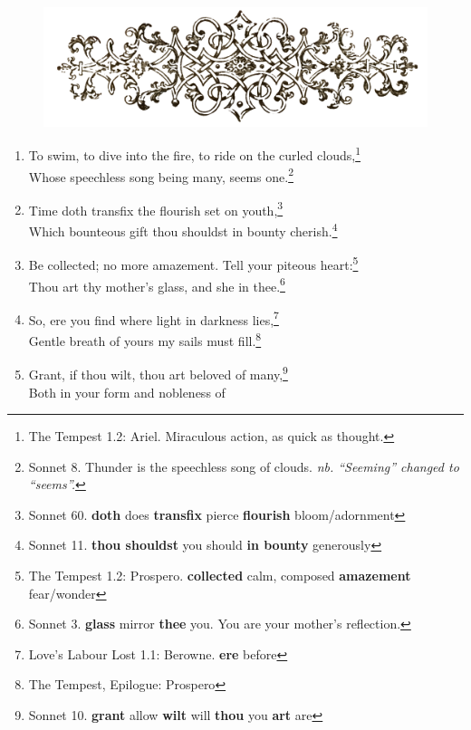 \documentclass[17pt,twoside]{extarticle}
\begin{document}
\thispagestyle{empty}

\begin{figure}[htbp]
\centering
\includegraphics[width=15.5cm]{images/frontispiece.png}
\end{figure}

\vspace{4mm}

\begin{enumerate}
\item
  To swim, to dive into the fire, to ride on the curled
  clouds,\footnote{The Tempest 1.2: Ariel. Miraculous action, as quick
    as thought.}\\Whose speechless song being many, seems one.\footnote{Sonnet
    8. Thunder is the speechless song of clouds. \emph{nb. ``Seeming''
    changed to ``seems''.}}
\item
  Time doth transfix the flourish set on youth,\footnote{Sonnet 60.
    \textbf{doth} does \textbf{transfix} pierce \textbf{flourish}
    bloom/adornment}\\Which bounteous gift thou shouldst in bounty
  cherish.\footnote{Sonnet 11. \textbf{thou shouldst} you should
    \textbf{in bounty} generously}
\item
  Be collected; no more amazement. Tell your piteous heart:\footnote{The
    Tempest 1.2: Prospero. \textbf{collected} calm, composed
    \textbf{amazement} fear/wonder}\\Thou art thy mother's glass, and
  she in thee.\footnote{Sonnet 3. \textbf{glass} mirror \textbf{thee}
    you. You are your mother's reflection.}
\item
  So, ere you find where light in darkness lies,\footnote{Love's Labour
    Lost 1.1: Berowne. \textbf{ere} before}\\Gentle breath of yours my
  sails must fill.\footnote{The Tempest, Epilogue: Prospero}
\item
  Grant, if thou wilt, thou art beloved of many,\footnote{Sonnet 10.
    \textbf{grant} allow \textbf{wilt} will \textbf{thou} you
    \textbf{art} are}\\Both in your form and nobleness of

\end{enumerate}
\end{document}
